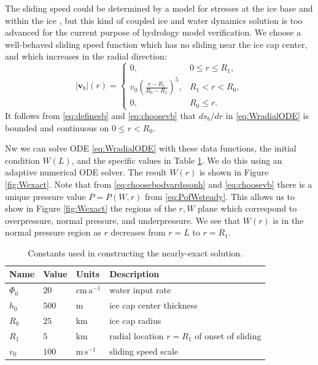 \documentclass[11pt,final]{amsart}%
\newcommand\bv{\mathbf{v}}
\begin{document}
The sliding speed could be determined by a model for stresses at the ice base and within the ice \citep{GreveBlatter2009}, but this kind of coupled ice and water dynamics solution is too advanced for the current purpose of hydrology model verification.  We choose a well-behaved sliding speed function which has no sliding near the ice cap center, and which increases in the radial direction:
\begin{equation}
|\bv_b|(r) = \begin{cases} 0, & 0 \le r \le R_1, \\
                           v_0  \left(\frac{r-R_1}{R_0-R_1}\right)^5, & R_1 < r < R_0, \\
                           0, & R_0 \le r.
             \end{cases}  \label{eq:choosevb}
\end{equation}
It follows from \eqref{eq:definesb} and \eqref{eq:choosevb} that $ds_b/dr$ in \eqref{eq:WradialODE} is bounded and continuous on $0\le r < R_0$.

Nw we can solve ODE \eqref{eq:WradialODE} with these data functions, the initial condition $W(L)$, and the specific values in Table \ref{tab:verifconstants}.  We do this using an adaptive numerical ODE solver.  The result $W(r)$ is shown in Figure \ref{fig:Wexact}.  Note that from \eqref{eq:choosebodvardssonh} and \eqref{eq:choosevb} there is a unique pressure value $P=P(W,r)$ from \eqref{eq:PofWsteady}.  This allows us to show in Figure \ref{fig:Wexact} the regions of the $r,W$ plane which correspond to overpressure, normal pressure, and underpressure.  We see that $W(r)$ is in the normal pressure region as $r$ decreases from $r=L$ to $r=R_1$.

\begin{table}[ht]
  \centering
  \caption{Constants used in constructing the nearly-exact solution.}
  \begin{tabular}{lllp{3.0in}}
    \textbf{Name} & \textbf{Value} & \textbf{Units} & \textbf{Description}\\
\hline
    $\Phi_0$ & $20$ & $\text{cm}\,\text{a}^{-1}$ & water input rate \\
    $h_0$ & $500$ & m & ice cap center thickness \\
    $R_0$ & $25$  & km & ice cap radius \\
    $R_1$ & $5$   & km & radial location $r=R_1$ of onset of sliding \\
    $v_0$ & $100$ & $\text{m}\,\text{s}^{-1}$ & sliding speed scale \\
    \hline
  \end{tabular}
 \label{tab:verifconstants}
\end{table}
\end{document}
